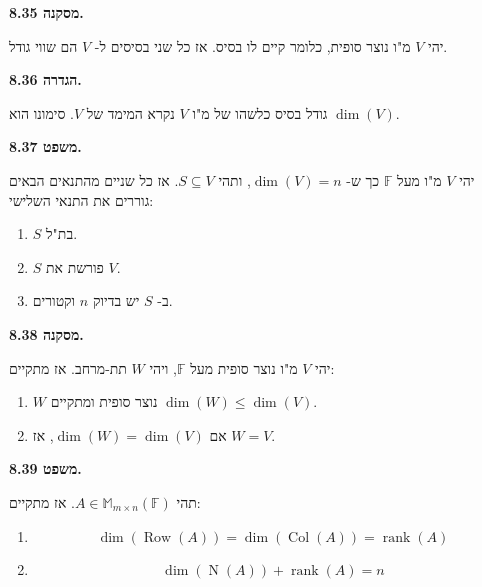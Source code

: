 \documentclass[12pt]{report}
\theoremstyle{plain}
\theoremstyle{definition}
\newcommand{\F}{\mathbb{F}}
\DeclareMathOperator{\rank}{rank}
\newcommand{\M}{\mathbb{M}}
\newcommand{\0}{\mathbf{0}}
\DeclareMathOperator{\Row}{Row}
\DeclareMathOperator{\Col}{Col}
\DeclareMathOperator{\Null}{N}
\begin{document}
\noindent\textbf{מסקנה 8.35.}

יהי 
$V$
מ"ו נוצר סופית, כלומר קיים לו בסיס. אז כל שני בסיסים ל-
$V$
הם שווי גודל.
\bigskip
\bigskip

\noindent\textbf{הגדרה 8.36.}

גודל בסיס כלשהו של מ"ו
$V$
נקרא המימד של
$V$.
סימונו הוא
$\dim(V)$.
\bigskip
\bigskip

\noindent\textbf{משפט 8.37.}

יהי
$V$
מ"ו מעל
$\F$
כך ש-
$\dim(V)=n$,
ותהי
$S\subseteq V$.
אז כל שניים מהתנאים הבאים גוררים את התנאי השלישי:
\begin{enumerate}[label=\alph*.]
\item
$S$
בת"ל.
\item
$S$
פורשת את
$V$.
\item
ב-
$S$
יש בדיוק 
$n$
וקטורים.
\end{enumerate}
\bigskip
\bigskip

\noindent\textbf{מסקנה 8.38.}

יהי
$V$
מ"ו נוצר סופית מעל
$\F$,
ויהי
$W$
תת-מרחב. אז מתקיים:
\begin{enumerate}[label=\alph*.]
\item 
$W$
נוצר סופית ומתקיים
$\dim(W)\leq \dim(V)$.
\item
אם
$\dim(W)=\dim(V)$,
אז 
$W=V$.
\end{enumerate}
\bigskip
\bigskip

\noindent\textbf{משפט 8.39.}

תהי
$A\in\M_{m\times n}(\F)$. 
אז מתקיים:
\begin{enumerate}[label=\alph*.]
\item
$$
\dim(\Row(A))=\dim(\Col(A))=\rank(A)
$$
\item
$$
\dim(\Null(A))+\rank(A)=n
$$
\end{enumerate}
\bigskip
\bigskip
\end{document}
